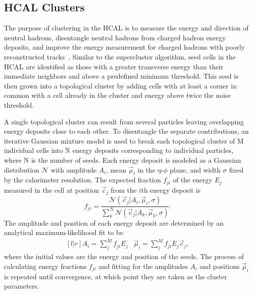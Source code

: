\subsection{HCAL Clusters}
\label{sec:pf_clusters}

The purpose of clustering in the HCAL is to measure the energy and direction of neutral hadrons, disentangle neutral hadrons from charged hadron energy deposits, and improve the energy measurement for charged hadrons with poorly reconstructed tracks~\cite{PF2017}.
Similar to the supercluster algorithm, seed cells in the HCAL are identified as those with a greater transverse energy than their immediate neighbors and above a predefined minimum threshold.
This seed is then grown into a topological cluster by adding cells with at least a corner in common with a cell already in the cluster and energy above twice the noise threshold.

A single topological cluster can result from several particles leaving overlapping energy deposits close to each other.
To disentangle the separate contributions, an iterative Gaussian mixture model is used to break each topological cluster of M individual cells into N energy deposits corresponding to individual particles, where N is the number of seeds.
Each energy deposit is modeled as a Gaussian distribution $\mathcal{N}$ with amplitude $A_i$, mean $\vec \mu_i$ in the $\eta$-$\phi$ plane, and width $\sigma$ fixed by the calorimeter resolution.
The expected fraction $f_{ji}$ of the energy $E_j$ measured in the cell at position $\vec c_j$ from the $i$th energy deposit is
\begin{equation}
  f_{ji} = \dfrac{\mathcal{N}\left(\vec c_j | A_i, \vec \mu_i, \sigma\right)}
  {\sum_k^N \mathcal{N}\left(\vec c_j | A_k, \vec \mu_k, \sigma\right)}.
\end{equation}
The amplitude and position of each energy deposit are determined by an analytical maximum-likelihood fit to be
\begin{equation}
  \begin{matrix}[l | r]
    A_i = \sum\limits_j^M f_{ji} E_j &
    \vec \mu_i = \sum\limits_j^M f_{ji} E_j \vec c_j,
  \end{matrix}
\end{equation}
where the initial values are the energy and position of the seeds.
The process of calculating energy fractions $f_{ji}$ and fitting for the amplitudes $A_i$ and positions $\vec \mu_i$ is repeated until convergence, at which point they are taken as the cluster parameters.

